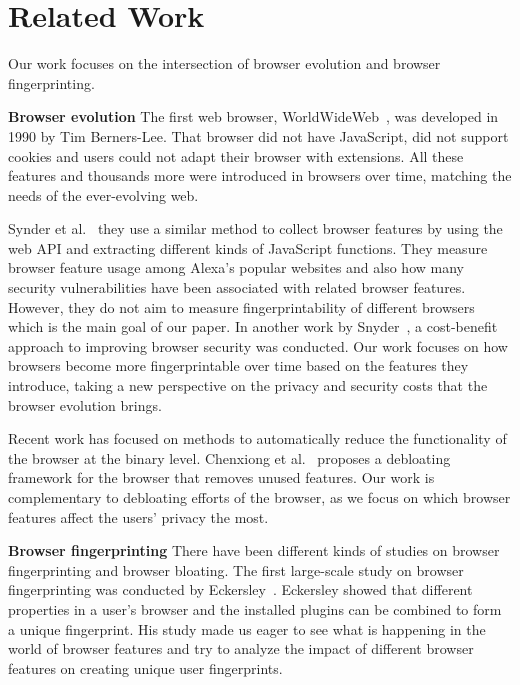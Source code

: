 \section{Related Work}
\label{sec:related-work}

Our work focuses on the intersection of browser evolution and browser fingerprinting. 

\textbf{Browser evolution} The first web browser, WorldWideWeb~\cite{WorldWideWeb}, was developed in 1990 by Tim Berners-Lee. That browser did not have JavaScript, did not support cookies and users could not adapt their browser with extensions. All these features and thousands more were introduced in browsers over time, matching the needs of the ever-evolving web. 

Synder et al.~\cite{snyder-imc16} they use a similar method to collect browser features by using the web API and extracting different kinds of JavaScript functions. They measure browser feature usage among Alexa's popular websites and also how many security vulnerabilities have been associated with related browser features. However, they do not aim to measure fingerprintability of different browsers which is the main goal of our paper. In another work by Snyder~\cite{snyder2017most}, a cost-benefit approach to improving browser security was conducted. 
Our work focuses on how browsers become more fingerprintable over time based on the features they introduce, taking a new perspective on the privacy and security costs that the browser evolution brings.

Recent work has focused on methods to automatically reduce the functionality of the browser at the binary level. Chenxiong et al.~\cite{slimium-ccs2020} proposes a debloating framework for the browser that removes unused features. Our work is complementary to debloating efforts of the browser, as we focus on which browser features affect the users' privacy the most.

\textbf{Browser fingerprinting} There have been different kinds of studies on browser fingerprinting and browser bloating. The first large-scale study on browser fingerprinting was conducted by Eckersley~\cite{Eckersley}. Eckersley showed that different properties in a user's browser and the installed plugins can be combined to form a unique fingerprint. His study made us eager to see what is happening in the world of browser features and try to analyze the impact of different browser features on creating unique user fingerprints.

